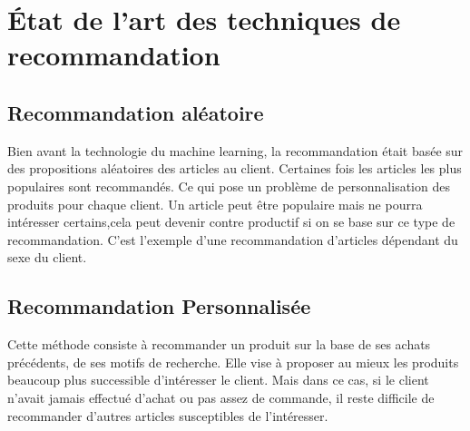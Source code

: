 \chapter{État de l'art des techniques de recommandation}
\minitoc
\newpage

\section{Recommandation aléatoire}
Bien avant la technologie du machine learning, la recommandation était basée sur des propositions aléatoires des articles au client. Certaines fois les articles les plus populaires sont recommandés. Ce qui pose un problème de personnalisation des produits pour chaque client. Un article peut être populaire mais ne pourra intéresser certains,cela peut devenir contre productif si on se base sur ce type de recommandation. C’est l’exemple d’une recommandation d’articles dépendant du sexe du client.

\section{Recommandation Personnalisée}
Cette méthode consiste à recommander un produit sur la base de ses achats précédents, de ses motifs de recherche. Elle vise à proposer au mieux les produits beaucoup plus successible d'intéresser le client. Mais dans ce cas, si le client n’avait jamais effectué d’achat ou pas assez de commande, il reste difficile de recommander d’autres articles susceptibles de l'intéresser.

